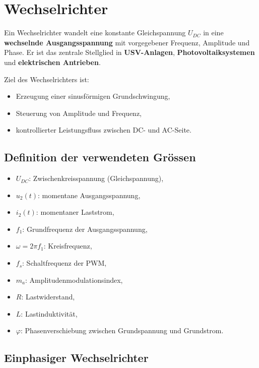 \section{Wechselrichter}

Ein Wechselrichter wandelt eine konstante Gleichspannung $U_{DC}$ in eine
\textbf{wechselnde Ausgangsspannung} mit vorgegebener Frequenz, Amplitude und Phase.
Er ist das zentrale Stellglied in \textbf{USV-Anlagen}, \textbf{Photovoltaiksystemen} und
\textbf{elektrischen Antrieben}.

Ziel des Wechselrichters ist:
\begin{itemize}
    \item Erzeugung einer sinusförmigen Grundschwingung,
    \item Steuerung von Amplitude und Frequenz,
    \item kontrollierter Leistungsfluss zwischen DC- und AC-Seite.
\end{itemize}

\subsection*{Definition der verwendeten Grössen}

\begin{itemize}
    \item $U_{DC}$: Zwischenkreisspannung (Gleichspannung),
    \item $u_2(t)$: momentane Ausgangsspannung,
    \item $i_2(t)$: momentaner Laststrom,
    \item $f_1$: Grundfrequenz der Ausgangsspannung,
    \item $\omega = 2\pi f_1$: Kreisfrequenz,
    \item $f_s$: Schaltfrequenz der PWM,
    \item $m_a$: Amplitudenmodulationsindex,
    \item $R$: Lastwiderstand,
    \item $L$: Lastinduktivität,
    \item $\varphi$: Phasenverschiebung zwischen Grundspannung und Grundstrom.
\end{itemize}

\subsection{Einphasiger Wechselrichter}

